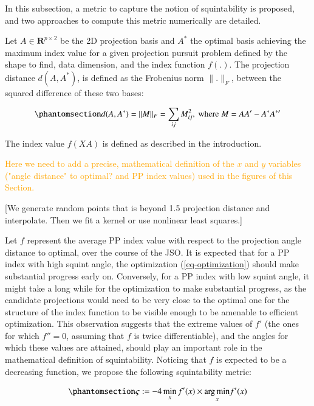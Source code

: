 \documentclass[
  number,
  preprint,
  3p]{elsarticle}
\begin{document}
In this subsection, a metric to capture the notion of squintability is
proposed, and two approaches to compute this metric numerically are
detailed.

Let \(A \in \mathbf{R}^{p \times 2}\) be the 2D projection basis and
\(A^*\) the optimal basis achieving the maximum index value for a given
projection pursuit problem defined by the shape to find, data dimension,
and the index function \(f(.)\). The projection distance \(d(A, A^*)\),
is defined as the Frobenius norm \(\lVert . \rVert _F\), between the
squared difference of these two bases:

\begin{equation}\phantomsection\label{eq-proj-dist}{d(A, A^*) = \lVert M \rVert _F = \sum_{ij} M_{ij}^2, \text{ where } M = AA^\prime - A^*A^{*\prime}}\end{equation}

The index value \(f(XA)\) is defined as described in the introduction.

\textcolor{orange}{Here we need to add a precise, mathematical
definition of the $x$ and $y$ variables ("angle distance" to optimal?
and PP index values) used in the figures of this Section.}

{[}We generate random points that is beyond 1.5 projection distance and
interpolate. Then we fit a kernel or use nonlinear least squares.{]}

Let \(f\) represent the average PP index value with respect to the
projection angle distance to optimal, over the course of the JSO. It is
expected that for a PP index with high squint angle, the optimization
(\ref{eq-optimization}) should make substantial progress early on.
Conversely, for a PP index with low squint angle, it might take a long
while for the optimization to make substantial progress, as the
candidate projections would need to be very close to the optimal one for
the structure of the index function to be visible enough to be amenable
to efficient optimization. This observation suggests that the extreme
values of \(f'\) (the ones for which \(f''=0\), assuming that \(f\) is
twice differentiable), and the angles for which these values are
attained, should play an important role in the mathematical definition
of squintability. Noticing that \(f\) is expected to be a decreasing
function, we propose the following squintability metric:

\begin{equation}\phantomsection\label{eq-squintability}{
\varsigma:=-4\min_{x}f'(x)\times\underset{x}{\arg\min}f'(x)
}\end{equation}
\end{document}
